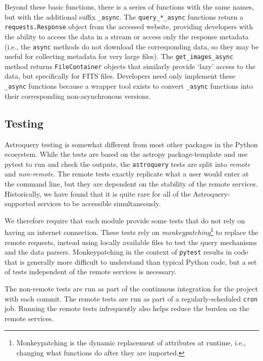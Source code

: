 \documentclass[twocolumn]{aastex61}
\begin{document}
Beyond these basic functions, there is a series of functions with the same
names, but with the additional suffix \texttt{\_async}.  The
\texttt{query\_*\_async} functions return a \texttt{requests.Response} object
from the accessed website, providing developers with
the ability to access the data in a stream or access only the response
metadata (i.e., the \texttt{async} methods do not download the corresponding
data, so they may be useful for collecting metadata for very large files).  The
\texttt{get\_images\_async} method returns
\texttt{FileContainer} objects that similarly provide `lazy' access to the
data, but specifically for FITS files.  Developers need only implement
these \texttt{\_async} functions because a wrapper tool exists to convert
\texttt{\_async} functions into their corresponding non-asynchronous versions.

\subsection{Testing}
Astroquery testing is somewhat different from most other packages in the Python
ecosystem.  While the tests are based on the astropy package-template and use
pytest to run and check the outputs, the \texttt{astroquery} tests are split into
\emph{remote} and \emph{non-remote}.  The remote tests exactly replicate what a user
would enter at the command line, but they are dependent on the stability of the
remote services.  Historically, we have found that it is quite rare for all of
the Astroquery-supported services to be accessible simultaneously.

We therefore require that each module provide some tests that do not rely on
having an internet connection.  These tests rely on
\emph{monkeypatching}\footnote{Monkeypatching is the dynamic replacement of
attributes at runtime, i.e., changing what functions do after they are
imported.} to
replace the remote requests, instead using locally available files to test the
query mechanisms and the data parsers.  Monkeypatching in the context of
\texttt{pytest} results in code that is generally more difficult to understand
than typical Python code, but a set of tests independent of the remote services
is necessary.

The non-remote tests are run as part of the continuous integration for the
project with each commit.  The remote tests are run as part of a
regularly-scheduled \texttt{cron} job.  Running the remote tests infrequently
also helps reduce the burden on the remote services.
\end{document}
